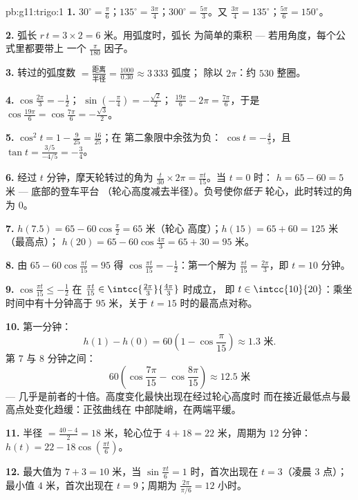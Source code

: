 \begin{solution}{pb:g11:trigo:1}
\textbf{1.} $30^\circ = \frac{\pi}{6}$；$135^\circ =
\frac{3\pi}{4}$；$300^\circ = \frac{5\pi}{3}$。又
$\frac{3\pi}{4} = 135^\circ$；$\frac{5\pi}{6} = 150^\circ$。

\textbf{2.} 弧长 $r\,t = 3 \times 2 = 6$ 米。用弧度时，弧长
为简单的乘积 --- 若用角度，每个公式里都要带上
一个 $\frac{\pi}{180}$ 因子。

\textbf{3.} 转过的弧度数 $= \frac{\text{距离}}
{\text{半径}} = \frac{1000}{0.30} \approx 3\,333$ 弧度；
除以 $2\pi$：约 $530$ 整圈。

\textbf{4.} $\cos\frac{2\pi}{3} = -\frac12$；
$\sin\left(-\frac\pi4\right) = -\frac{\sqrt2}{2}$；
$\frac{19\pi}{6} - 2\pi = \frac{7\pi}{6}$，于是
$\cos\frac{19\pi}{6} = \cos\frac{7\pi}{6} =
-\frac{\sqrt3}{2}$。

\textbf{5.} $\cos^2 t = 1 - \frac{9}{25} = \frac{16}{25}$；在
第二象限中余弦为负：
$\cos t = -\frac45$，且
$\tan t = \frac{3/5}{-4/5} = -\frac34$。

\textbf{6.} 经过 $t$ 分钟，摩天轮转过的角为
$\frac{t}{30} \times 2\pi = \frac{\pi t}{15}$。当 $t = 0$ 时：
$h = 65 - 60 = 5$ 米 --- 底部的登车平台
（轮心高度减去半径）。负号使你\emph{低于}
轮心，此时转过的角为 $0$。

\textbf{7.} $h(7.5) = 65 - 60\cos\frac{\pi}{2} = 65$ 米（轮心
高度）；$h(15) = 65 + 60 = 125$ 米（最高点）；
$h(20) = 65 - 60\cos\frac{4\pi}{3} = 65 + 30 = 95$ 米。

\textbf{8.} 由 $65 - 60\cos\frac{\pi t}{15} = 95$ 得
$\cos\frac{\pi t}{15} = -\frac12$：第一个解为
$\frac{\pi t}{15} = \frac{2\pi}{3}$，即 $t = 10$ 分钟。

\textbf{9.} $\cos\frac{\pi t}{15} \leq -\frac12$ 在
$\frac{\pi t}{15} \in \intcc{\frac{2\pi}{3}}{\frac{4\pi}{3}}$ 时成立，
即 $t \in \intcc{10}{20}$：乘坐时间中有十分钟高于
$95$ 米，关于 $t = 15$ 时的最高点对称。

\textbf{10.} 第一分钟：
\[
h(1) - h(0) = 60\left(1 - \cos\frac{\pi}{15}\right)
\approx 1.3 \text{ 米}.
\]
第 $7$ 与 $8$ 分钟之间：
\[
60\left(\cos\frac{7\pi}{15} - \cos\frac{8\pi}{15}\right)
\approx 12.5 \text{ 米}
\]
--- 几乎是前者的十倍。高度变化最快出现在经过轮心高度时
而在接近最低点与最高点处变化趋缓：正弦曲线在
中部陡峭，在两端平缓。

\textbf{11.} 半径 $= \frac{40 - 4}{2} = 18$ 米，轮心位于
$4 + 18 = 22$ 米，周期为 $12$ 分钟：
$h(t) = 22 - 18\cos\left(\frac{\pi t}{6}\right)$。

\textbf{12.} 最大值为 $7 + 3 = 10$ 米，当
$\sin\frac{\pi t}{6} = 1$ 时，首次出现在 $t = 3$（凌晨 3 点）；
最小值 $4$ 米，首次出现在 $t = 9$；周期为
$\frac{2\pi}{\pi/6} = 12$ 小时。


\end{solution}
